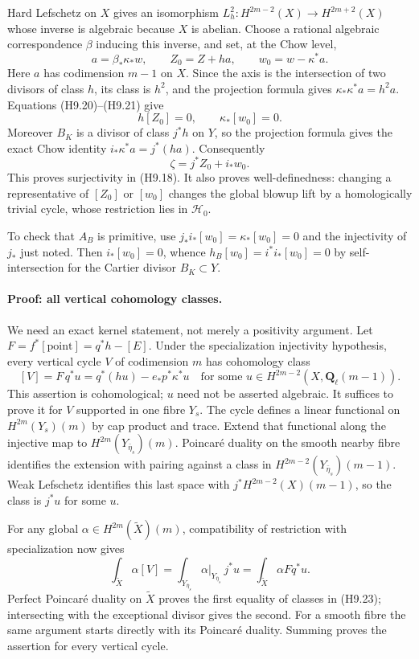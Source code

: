 Hard Lefschetz on $X$ gives an isomorphism
$L_h^2:H^{2m-2}(X)\to H^{2m+2}(X)$ whose inverse is algebraic because
$X$ is abelian. Choose a rational algebraic correspondence $\beta$
inducing this inverse, and set, at the Chow level,
\[
 a=\beta_*\kappa_*w,\qquad Z_0=Z+h a,
 \qquad w_0=w-\kappa^*a.                                      \tag{H9.21}
\]
Here $a$ has codimension $m-1$ on $X$. Since the axis is the
intersection of two divisors of class $h$, its class is $h^2$, and the
projection formula gives $\kappa_*\kappa^*a=h^2a$.
Equations (H9.20)--(H9.21) give
\[
 h[Z_0]=0,\qquad \kappa_*[w_0]=0.
\]
Moreover $B_K$ is a divisor of class $j^*h$ on $Y$, so the projection
formula gives the exact Chow identity $i_*\kappa^*a=j^*(h a)$.
Consequently
\[
 \zeta=j^*Z_0+i_*w_0.                                         \tag{H9.22}
\]
This proves surjectivity in (H9.18). It also proves well-definedness:
changing a representative of $[Z_0]$ or $[w_0]$ changes the global
blowup lift by a homologically trivial cycle, whose restriction lies
in $\mathcal H_0$.

To check that $A_B$ is primitive, use
$j_*i_*[w_0]=\kappa_*[w_0]=0$ and the injectivity of $j_*$ just noted.
Then $i_*[w_0]=0$, whence
$h_B[w_0]=i^*i_*[w_0]=0$ by self-intersection for the Cartier divisor
$B_K\subset Y$.

\paragraph{Proof: all vertical cohomology classes.}
We need an exact kernel statement, not merely a positivity argument.
Let $F=f^*[\mathrm{point}]=q^*h-[E]$. Under the specialization
injectivity hypothesis, every vertical cycle $V$ of codimension $m$
has cohomology class
\[
 [V]=F\,q^*u=q^*(h u)-e_*p^*\kappa^*u
 \quad\text{for some }u\in H^{2m-2}(X,\mathbf Q_\ell(m-1)).     \tag{H9.23}
\]
This assertion is cohomological; $u$ need not be asserted algebraic.
It suffices to prove it for $V$ supported in one fibre $Y_s$.
The cycle defines a linear functional on $H^{2m}(Y_s)(m)$ by cap
product and trace. Extend that functional along the injective map to
$H^{2m}(Y_{\bar\eta_s})(m)$. Poincar\'e duality on the smooth nearby
fibre identifies the extension with pairing against a class in
$H^{2m-2}(Y_{\bar\eta_s})(m-1)$. Weak Lefschetz identifies this last
space with $j^*H^{2m-2}(X)(m-1)$, so the class is $j^*u$ for some $u$.

For any global $\alpha\in H^{2m}(\widetilde X)(m)$, compatibility of
restriction with specialization now gives
\[
 \int_{\widetilde X}\alpha[V]
   =\int_{Y_{\bar\eta_s}}\alpha|_{Y_{\bar\eta_s}}\,j^*u
   =\int_{\widetilde X}\alpha Fq^*u.
\]
Perfect Poincar\'e duality on $\widetilde X$ proves the first equality
of classes in (H9.23); intersecting with the exceptional divisor gives
the second. For a smooth fibre the same argument starts directly with
its Poincar\'e duality. Summing proves the assertion for every vertical
cycle.

